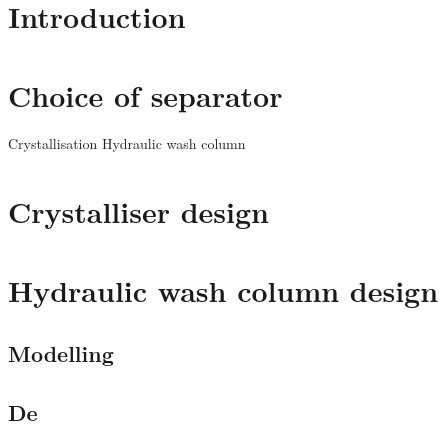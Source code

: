 \section{Introduction}


\section{Choice of separator}
Crystallisation 
Hydraulic wash column 


\section{Crystalliser design}




\section{Hydraulic wash column design}
\subsection{Modelling}

\subsection{De}
